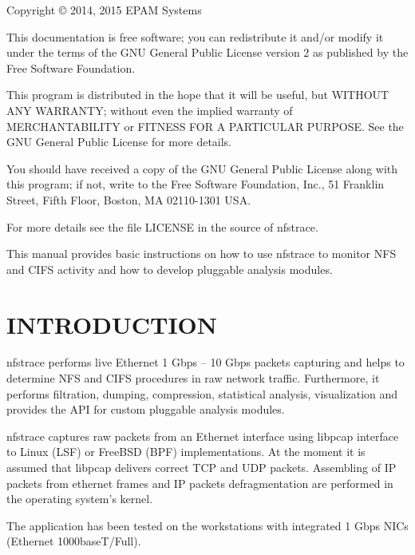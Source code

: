 \documentclass{article}
\newcommand*{\textfile}[1]{\textsf{#1}}
\newcommand*{\textprog}[1]{\textfile{#1}}
\begin{document}
\vspace{5mm}
Copyright © 2014, 2015 EPAM Systems 

\vspace{5mm} This documentation is free software; you can redistribute it
and/or modify it under the terms of the GNU General Public License version 2 as
published by the Free Software Foundation.  

\vspace{5mm} This program is distributed in the hope that it will be useful,
but WITHOUT ANY WARRANTY; without even the implied warranty of MERCHANTABILITY
or FITNESS FOR A PARTICULAR PURPOSE. See the GNU General Public License for
more details.

\vspace{5mm} You should have received a copy of the GNU General Public License
along with this program; if not, write to the Free Software Foundation, Inc.,
51 Franklin Street, Fifth Floor, Boston, MA 02110-1301 USA.

\vspace{5mm} For more details see the file LICENSE in the source of nfstrace.

\vspace{5mm} This manual provides basic instructions on how to use \textprog{nfstrace} to
monitor \gls{NFS} and \gls{CIFS} activity and how to develop pluggable analysis
modules.

\newpage 

\tableofcontents

\newpage

\section{INTRODUCTION}

nfstrace performs live Ethernet 1 Gbps – 10 Gbps packets capturing and helps to
determine \gls{NFS} and \gls{CIFS} procedures in raw network traffic.
Furthermore, it performs filtration, dumping, compression, statistical
analysis, visualization and provides the API for custom pluggable analysis
modules. 

nfstrace captures raw packets from an Ethernet interface using libpcap
interface to Linux (\gls{LSF}) or FreeBSD (\gls{BPF}) implementations. At the
moment it is assumed that libpcap delivers correct TCP and UDP packets.
Assembling of IP packets from ethernet frames and IP packets defragmentation
are performed in the operating system's kernel.

The application has been tested on the workstations with integrated 1 Gbps
\gls{NIC}s (Ethernet 1000baseT/Full).
\end{document}
